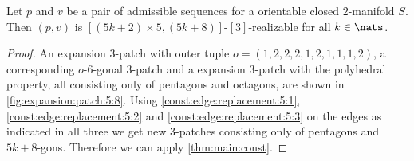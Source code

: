 \clearpage
\begin{theorem}
  Let $p$ and $v$ be a pair of admissible sequences for a orientable closed $2$-manifold $S$. Then $(p, v)$ is $[(5k + 2) \times 5, (5k+8)]$-$[3]$-realizable for all $k \in \nats$.
  \begin{proof} An expansion $3$-patch with outer tuple $o = (1, 2, 2, 2, 1, 2, 1, 1, 1, 2)$, a corresponding $o$-$6$-gonal $3$-patch and a expansion $3$-patch with the polyhedral property, all consisting only of pentagons and octagons, are shown in \autoref{fig:expansion:patch:5:8}. Using \autoref{const:edge:replacement:5:1}, \autoref{const:edge:replacement:5:2} and \autoref{const:edge:replacement:5:3} on the edges as indicated in all three we get new $3$-patches consisting only of pentagons and $5k + 8$-gons. Therefore we can apply \autoref{thm:main:const}.
  \end{proof}
\end{theorem}%
